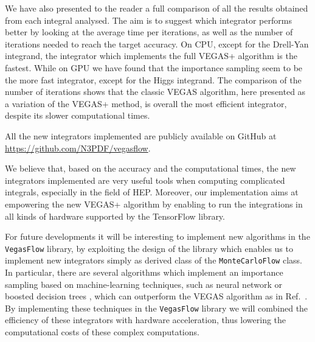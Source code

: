\documentclass[../main/main.tex]{subfiles}
\begin{document}
We have also presented to the reader a full comparison of all the results obtained from each integral analysed. The aim is to suggest which integrator performs better by looking at the average time per iterations, as well as the number of iterations needed to reach the target accuracy. On CPU, except for the Drell-Yan integrand, the integrator which implements the full VEGAS+ algorithm is the fastest. While on GPU we have found that the importance sampling seem to be the more fast integrator, except for the Higgs integrand.
The comparison of the number of iterations shows that the classic VEGAS algorithm, here presented as a variation of the VEGAS+ method, is overall the most efficient 
integrator, despite its slower computational times. 

All the new integrators implemented are publicly available on GitHub at \url{https://github.com/N3PDF/vegasflow}.

We believe that, based on the accuracy and the computational times, the new integrators implemented are very useful tools when computing complicated integrals, especially in the field of HEP. Moreover, our implementation aims at empowering the new VEGAS+ algorithm by enabling to run the integrations in all kinds of hardware supported by the TensorFlow library.

For future developments it will be interesting to implement new algorithms in the \texttt{VegasFlow} library, by exploiting the design of the library which enables us to implement new integrators simply as derived class of the \texttt{MonteCarloFlow} class. In particular, there are several algorithms which implement an importance sampling based on machine-learning techniques, such as neural network or boosted decision trees \cite{Bendavid:2017zhk}, which can outperform the VEGAS algorithm as in Ref.~\cite{Gao:2020vdv}. 
By implementing these techniques in the \texttt{VegasFlow} library we will combined the efficiency of these integrators with hardware acceleration, thus lowering the computational costs of these complex computations.
\end{document}
